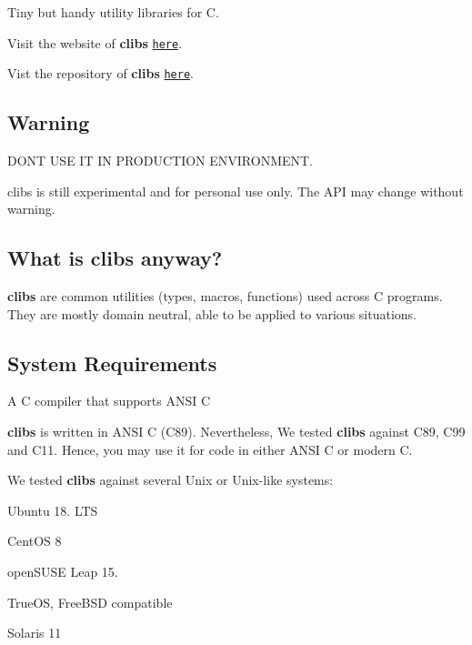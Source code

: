Tiny but handy utility libraries for C.

Visit the website of {\bfseries clibs} \href{https://cwchentw.github.io/clibs/html/index.html}{\tt here}.

Vist the repository of {\bfseries clibs} \href{https://github.com/cwchentw/clibs/}{\tt here}.

\subsection*{Warning}

D\+ON\textquotesingle{}T U\+SE IT IN P\+R\+O\+D\+U\+C\+T\+I\+ON E\+N\+V\+I\+R\+O\+N\+M\+E\+NT.

clibs is still experimental and for personal use only. The A\+PI may change without warning.

\subsection*{What is clibs anyway?}

{\bfseries clibs} are common utilities (types, macros, functions) used across C programs. They are mostly domain neutral, able to be applied to various situations.

\subsection*{System Requirements}


\begin{DoxyItemize}
\item A C compiler that supports A\+N\+SI C
\end{DoxyItemize}

{\bfseries clibs} is written in A\+N\+SI C (C89). Nevertheless, We tested {\bfseries clibs} against C89, C99 and C11. Hence, you may use it for code in either A\+N\+SI C or modern C.

We tested {\bfseries clibs} against several Unix or Unix-\/like systems\+:


\begin{DoxyItemize}
\item Ubuntu 18. L\+TS
\item Cent\+OS 8
\item open\+S\+U\+SE Leap 15.
\item True\+OS, Free\+B\+SD compatible
\item Solaris 11
\end{DoxyItemize}


